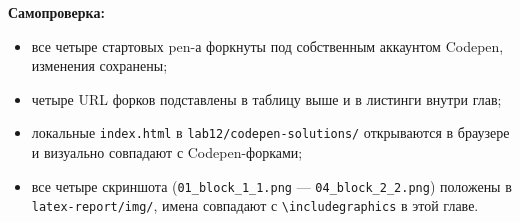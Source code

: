 \textbf{Самопроверка:}
\begin{itemize}
  \item все четыре стартовых pen-а форкнуты под собственным
        аккаунтом Codepen, изменения сохранены;
  \item четыре URL форков подставлены в таблицу выше и в листинги
        внутри глав;
  \item локальные \texttt{index.html} в \texttt{lab12/codepen-solutions/}
        открываются в браузере и визуально совпадают с
        Codepen-форками;
  \item все четыре скриншота (\texttt{01\_block\_1\_1.png} ---
        \texttt{04\_block\_2\_2.png}) положены в
        \texttt{latex-report/img/}, имена совпадают с
        \texttt{\textbackslash includegraphics} в этой главе.
\end{itemize}

\endinput
